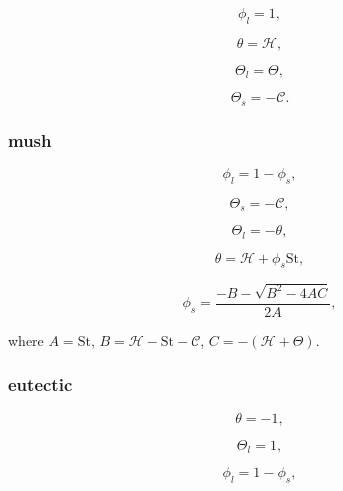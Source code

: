\documentclass[a4paper,11pt]{article}
\numberwithin{equation}{section}
\begin{document}
\begin{equation*}
\phi_l = 1,
\end{equation*}

\begin{equation*}
\theta = \mathcal{H},
\end{equation*}

\begin{equation*}
\Theta_l = \Theta,
\end{equation*}

\begin{equation*}
\Theta_s = -\mathcal{C}.
\end{equation*}

\subsubsection{mush} \label{ssub:mush}

\begin{equation*}
\phi_l = 1 - \phi_s,
\end{equation*}

\begin{equation*}
\Theta_s = - \mathcal{C},
\end{equation*}

\begin{equation*}
\Theta_l = - \theta,
\end{equation*}

\begin{equation*}
\theta = \mathcal{H} + \phi_s \text{St},
\end{equation*}

\begin{equation*}
\phi_s = \frac{-B - \sqrt{B^2 - 4AC}}{2A},
\end{equation*}

where $A=\text{St}$, $B = \mathcal{H} - \text{St} - \mathcal{C}$, $C = -(\mathcal{H} + \Theta)$.

\subsubsection{eutectic} \label{ssub:eutectic}

\begin{equation*}
\theta = -1,
\end{equation*}

\begin{equation*}
\Theta_l = 1,
\end{equation*}

\begin{equation*}
\phi_l = 1 - \phi_s,
\end{equation*}
\end{document}
